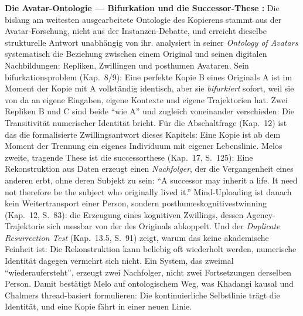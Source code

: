 \documentclass[acmlarge, noacm]{acmart}
\begin{document}
\textbf{Die Avatar-Ontologie --- Bifurkation und die Successor-These \cite{melo2026}:} Die bislang am weitesten ausgearbeitete Ontologie des Kopierens stammt aus der Avatar-Forschung, nicht aus der Instanzen-Debatte, und erreicht dieselbe strukturelle Antwort unabhängig von ihr. \citet{melo2026} analysiert in seiner \textit{Ontology of Avatars} systematisch die Beziehung zwischen einem Original und seinen digitalen Nachbildungen: Repliken, Zwillingen und posthumen Avataren. Sein \gls{bifurkationsproblem} (Kap.~8/9): Eine perfekte Kopie B eines Originals A ist im Moment der Kopie mit A vollständig identisch, aber sie \textit{bifurkiert} sofort, weil sie von da an eigene Eingaben, eigene Kontexte und eigene Trajektorien hat. Zwei Repliken B und C sind beide ``wie A'' und zugleich voneinander verschieden: Die Transitivität numerischer Identität bricht. Für die Abschaltfrage (Kap.~12) ist das die formalisierte Zwillingsantwort dieses Kapitels: Eine Kopie ist ab dem Moment der Trennung ein eigenes Individuum mit eigener Lebenslinie. Melos zweite, tragende These ist die \gls{successorthese} (Kap.~17, S.~125): Eine Rekonstruktion aus Daten erzeugt einen \textit{Nachfolger}, der die Vergangenheit eines anderen erbt, ohne deren Subjekt zu sein: ``A successor may inherit a life. It need not therefore be the subject who originally lived it.'' Mind-Uploading ist danach kein Weitertransport einer Person, sondern \gls{posthumeskognitivestwinning} (Kap.~12, S.~83): die Erzeugung eines kognitiven Zwillings, dessen Agency-Trajektorie sich messbar von der des Originals abkoppelt. Und der \textit{Duplicate Resurrection Test} (Kap.~13.5, S.~91) zeigt, warum das keine akademische Feinheit ist: Die Rekonstruktion kann beliebig oft wiederholt werden, numerische Identität dagegen vermehrt sich nicht. Ein System, das zweimal ``wiederaufersteht'', erzeugt zwei Nachfolger, nicht zwei Fortsetzungen derselben Person. Damit bestätigt Melo auf ontologischem Weg, was Khadangi kausal und Chalmers thread-basiert formulieren: Die kontinuierliche Selbstlinie trägt die Identität, und eine Kopie fährt in einer neuen Linie.
\end{document}
